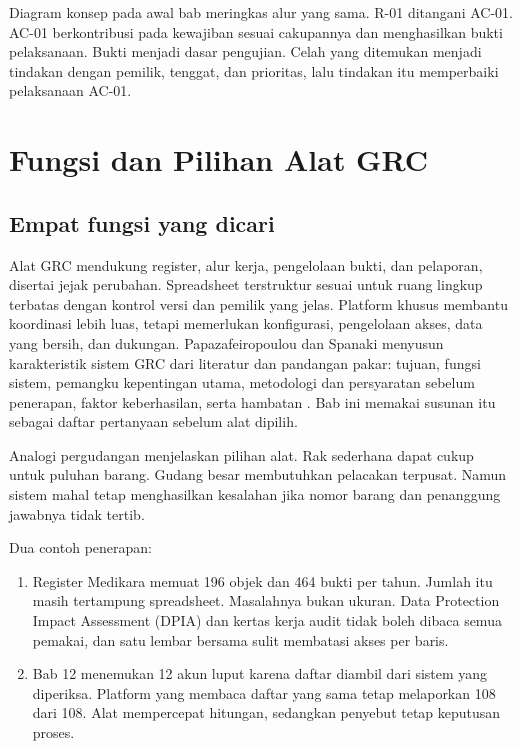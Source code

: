 Diagram konsep pada awal bab meringkas alur yang sama. R-01 ditangani AC-01. AC-01 berkontribusi
pada kewajiban sesuai cakupannya dan menghasilkan bukti pelaksanaan. Bukti menjadi dasar pengujian.
Celah yang ditemukan menjadi tindakan dengan pemilik, tenggat, dan prioritas, lalu tindakan itu
memperbaiki pelaksanaan AC-01.

\section{Fungsi dan Pilihan Alat GRC}

\subsection*{Empat fungsi yang dicari}

Alat GRC mendukung register, alur kerja, pengelolaan bukti, dan pelaporan, disertai jejak
perubahan. Spreadsheet terstruktur sesuai untuk ruang lingkup terbatas dengan kontrol versi dan
pemilik yang jelas. Platform khusus membantu koordinasi lebih luas, tetapi memerlukan
konfigurasi, pengelolaan akses, data yang bersih, dan dukungan. Papazafeiropoulou dan Spanaki
menyusun karakteristik sistem GRC dari literatur dan pandangan pakar: tujuan, fungsi sistem,
pemangku kepentingan utama, metodologi dan persyaratan sebelum penerapan, faktor keberhasilan,
serta hambatan \cite{c14-papazafeiropoulou2015}. Bab ini memakai susunan itu sebagai daftar
pertanyaan sebelum alat dipilih.

Analogi pergudangan menjelaskan pilihan alat. Rak sederhana dapat cukup untuk puluhan barang.
Gudang besar membutuhkan pelacakan terpusat. Namun sistem mahal tetap menghasilkan kesalahan jika
nomor barang dan penanggung jawabnya tidak tertib.

Dua contoh penerapan:
\begin{enumerate}
  \item Register Medikara memuat 196 objek dan 464 bukti per tahun. Jumlah itu masih tertampung
  spreadsheet. Masalahnya bukan ukuran. Data Protection Impact Assessment (DPIA) dan kertas kerja
  audit tidak boleh dibaca semua pemakai, dan satu lembar bersama sulit membatasi akses per baris.
  \item Bab 12 menemukan 12 akun luput karena daftar diambil dari sistem yang diperiksa. Platform
  yang membaca daftar yang sama tetap melaporkan 108 dari 108. Alat mempercepat hitungan,
  sedangkan penyebut tetap keputusan proses.
\end{enumerate}

